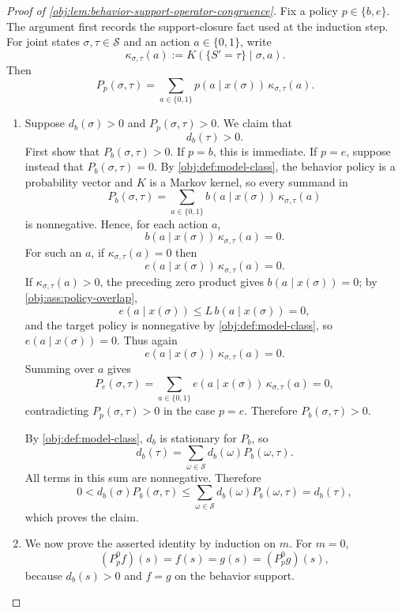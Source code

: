 \begin{proof}[Proof of \cref{obj:lem:behavior-support-operator-congruence}]
Fix a policy \(p\in\{b,e\}\).  The argument first records the support-closure fact used at the induction step.  For joint states \(\sigma,\tau\in\mathcal S\) and an action \(a\in\{0,1\}\), write
\[
\kappa_{\sigma,\tau}(a)
:=
K(\{S'=\tau\}\mid \sigma,a).
\]
Then
\[
P_p(\sigma,\tau)
=
\sum_{a\in\{0,1\}}p(a\mid x(\sigma))\,\kappa_{\sigma,\tau}(a).
\]

\begin{enumerate}
\item Suppose \(d_b(\sigma)>0\) and \(P_p(\sigma,\tau)>0\).  We claim that
\[
d_b(\tau)>0 .
\]
First show that \(P_b(\sigma,\tau)>0\).  If \(p=b\), this is immediate.  If \(p=e\), suppose instead that \(P_b(\sigma,\tau)=0\).  By \cref{obj:def:model-class}, the behavior policy is a probability vector and \(K\) is a Markov kernel, so every summand in
\[
P_b(\sigma,\tau)
=
\sum_{a\in\{0,1\}} b(a\mid x(\sigma))\,\kappa_{\sigma,\tau}(a)
\]
is nonnegative.  Hence, for each action \(a\),
\[
b(a\mid x(\sigma))\,\kappa_{\sigma,\tau}(a)=0 .
\]
For such an \(a\), if \(\kappa_{\sigma,\tau}(a)=0\) then
\[
e(a\mid x(\sigma))\,\kappa_{\sigma,\tau}(a)=0.
\]
If \(\kappa_{\sigma,\tau}(a)>0\), the preceding zero product gives \(b(a\mid x(\sigma))=0\); by \cref{obj:ass:policy-overlap},
\[
e(a\mid x(\sigma))
\le
L\,b(a\mid x(\sigma))
=
0,
\]
and the target policy is nonnegative by \cref{obj:def:model-class}, so \(e(a\mid x(\sigma))=0\).  Thus again
\[
e(a\mid x(\sigma))\,\kappa_{\sigma,\tau}(a)=0 .
\]
Summing over \(a\) gives
\[
P_e(\sigma,\tau)
=
\sum_{a\in\{0,1\}}e(a\mid x(\sigma))\,\kappa_{\sigma,\tau}(a)
=
0,
\]
contradicting \(P_p(\sigma,\tau)>0\) in the case \(p=e\).  Therefore \(P_b(\sigma,\tau)>0\).

By \cref{obj:def:model-class}, \(d_b\) is stationary for \(P_b\), so
\[
d_b(\tau)
=
\sum_{\omega\in\mathcal S} d_b(\omega)P_b(\omega,\tau).
\]
All terms in this sum are nonnegative.  Therefore
\[
0
<
d_b(\sigma)P_b(\sigma,\tau)
\le
\sum_{\omega\in\mathcal S} d_b(\omega)P_b(\omega,\tau)
=
d_b(\tau),
\]
which proves the claim. %

\item We now prove the asserted identity by induction on \(m\).  For \(m=0\),
\[
(P_p^0f)(s)=f(s)=g(s)=(P_p^0g)(s),
\]
because \(d_b(s)>0\) and \(f=g\) on the behavior support.


\end{enumerate}
\end{proof}
